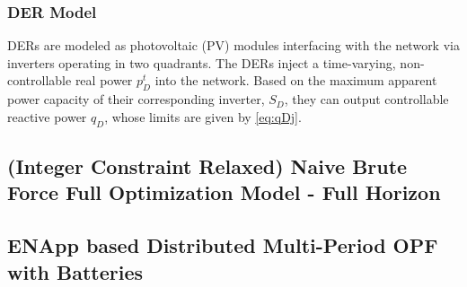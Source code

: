 \documentclass{article}
\begin{document}
\subsubsection{DER Model}

DERs are modeled as photovoltaic (PV) modules interfacing with the network via inverters operating in two quadrants. The DERs inject a time-varying, non-controllable real power $p^{t}_{D}$ into the network. Based on the maximum apparent power capacity of their corresponding inverter, $S_{D}$, they can output controllable reactive power $q_{D}$, whose limits are given by \cref{eq:qDj}.



\subsection*{(Integer Constraint Relaxed) Naive Brute Force Full Optimization Model - Full Horizon}



\subsection{ENApp based Distributed Multi-Period OPF with Batteries}
\end{document}
